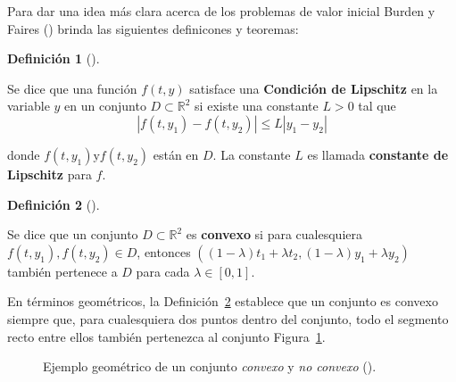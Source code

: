 \documentclass[
  spanish,
  us-letterpaper,
  DIV=11,
  numbers=noendperiod]{scrreprt}
\theoremstyle{definition}
\newtheorem{definition}{Definición}[chapter]
\theoremstyle{plain}
\theoremstyle{remark}
\begin{document}
Para dar una idea más clara acerca de los problemas de valor inicial
Burden y Faires () brinda las siguientes
definicones y teoremas:

\begin{definition}[]\protect\hypertarget{def-Lip-con}{}\label{def-Lip-con}

Se dice que una función \(f(t,y)\) satisface una \textbf{Condición de
Lipschitz} en la variable \(y\) en un conjunto
\(D \subset \mathbb{R}^2\) si existe una constante \(L>0\) tal que \[
|f(t,y_1) - f(t,y_2)| \leq L|y_1-y_2|
\]

donde \(f(t,y_1) \text{y} f(t,y_2)\) están en \(D\). La constante \(L\)
es llamada \textbf{constante de Lipschitz} para \(f\).

\end{definition}

\begin{definition}[]\protect\hypertarget{def-convex-set}{}\label{def-convex-set}

Se dice que un conjunto \(D \subset \mathbb{R}^2\) es \textbf{convexo}
si para cualesquiera \(f(t,y_1), f(t,y_2) \in D\), entonces
\(((1-\lambda)t_1 + \lambda t_2, (1-\lambda)y_1 + \lambda y_2)\) también
pertenece a \(D\) para cada \(\lambda \in[0,1]\).

\end{definition}

En términos geométricos, la Definición~\ref{def-convex-set} establece
que un conjunto es convexo siempre que, para cualesquiera dos puntos
dentro del conjunto, todo el segmento recto entre ellos también
pertenezca al conjunto Figura~\ref{fig-convx-set}.

\begin{figure}


\caption{\label{fig-convx-set}Ejemplo geométrico de un conjunto
\emph{convexo} y \emph{no convexo} ().}

\end{figure}%
\end{document}
